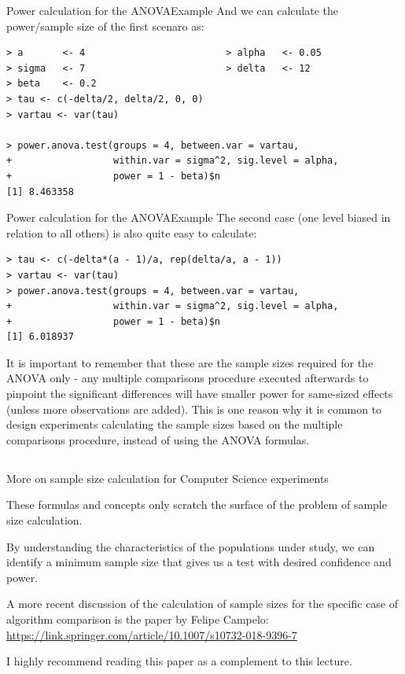 \begin{frame}[fragile]{Power calculation for the ANOVA}{Example}
And we can calculate the power/sample size of the first scenaro as:

{\smaller
\begin{verbatim}
> a       <- 4                         > alpha   <- 0.05
> sigma   <- 7                         > delta   <- 12
> beta    <- 0.2
> tau <- c(-delta/2, delta/2, 0, 0)
> vartau <- var(tau)

> power.anova.test(groups = 4, between.var = vartau,
+                  within.var = sigma^2, sig.level = alpha,
+                  power = 1 - beta)$n
[1] 8.463358
\end{verbatim}}
\end{frame}



\begin{frame}[fragile]{Power calculation for the ANOVA}{Example}
The second case (one level biased in relation to all others) is also quite easy to calculate:

{\smaller
\begin{verbatim}
> tau <- c(-delta*(a - 1)/a, rep(delta/a, a - 1))
> vartau <- var(tau)
> power.anova.test(groups = 4, between.var = vartau,
+                  within.var = sigma^2, sig.level = alpha,
+                  power = 1 - beta)$n
[1] 6.018937
\end{verbatim}}

It is important to remember that these are the sample sizes required
for the ANOVA only - any multiple comparisons procedure executed
afterwards to pinpoint the significant differences will have smaller
power for same-sized effects (unless more observations are
added). This is one reason why it is common to design experiments
calculating the sample sizes based on the multiple comparisons
procedure, instead of using the ANOVA formulas.
\end{frame}

\subsection{}
\begin{frame}{More on sample size calculation for Computer Science experiments}

  These formulas and concepts only scratch the surface of the problem of sample size calculation. \bigskip

  By understanding the characteristics of the populations under study, we can identify a minimum sample size that gives us a test with desired confidence and power.\bigskip

  A more recent discussion of the calculation of sample sizes for the specific case of algorithm comparison is the paper by Felipe Campelo:\\
  \url{https://link.springer.com/article/10.1007/s10732-018-9396-7}\bigskip

  I highly recommend reading this paper as a complement to this lecture.
\end{frame}

